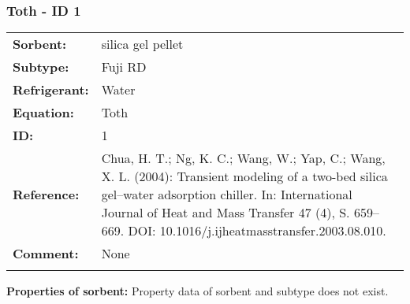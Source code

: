 \subsubsection{Toth - ID 1}
%
\begin{tabular}[l]{|lp{11.5cm}|}
\hline
\addlinespace

\textbf{Sorbent:} & silica gel pellet \\
\textbf{Subtype:} & Fuji RD \\
\textbf{Refrigerant:} & Water \\
\textbf{Equation:} & Toth \\
\textbf{ID:} & 1 \\
\textbf{Reference:} & Chua, H. T.; Ng, K. C.; Wang, W.; Yap, C.; Wang, X. L. (2004): Transient modeling of a two-bed silica gel–water adsorption chiller. In: International Journal of Heat and Mass Transfer 47 (4), S. 659–669. DOI: 10.1016/j.ijheatmasstransfer.2003.08.010. \\
\textbf{Comment:} & None \\

\addlinespace
\hline
\end{tabular}
\newline

\textbf{Properties of sorbent:}
\newline
%
Property data of sorbent and subtype does not exist.


